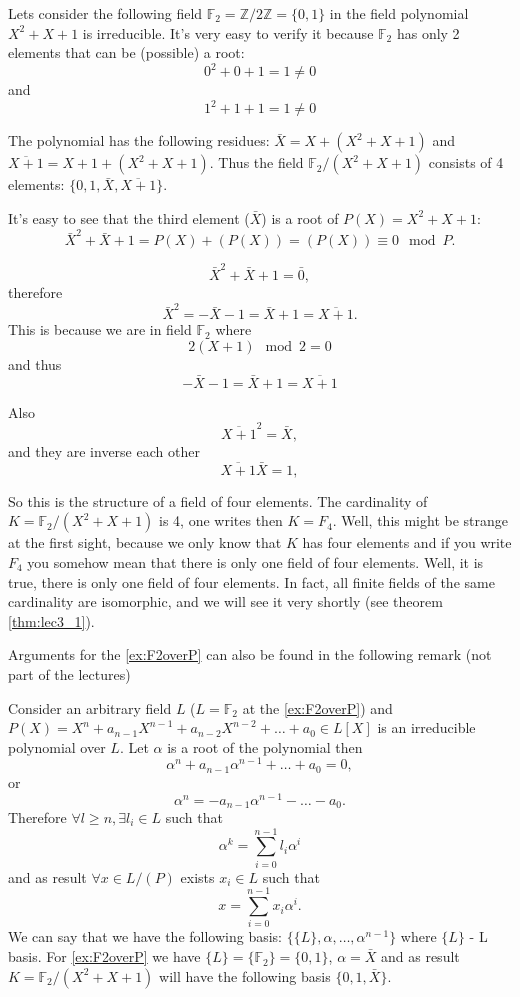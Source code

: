 \begin{example}[$K = \mathbb{F}_2/\left(X^2+X+1\right)$]
  Lets consider the following field
  $\mathbb{F}_2 = \mathbb{Z}/2\mathbb{Z} = \{0,1\}$ in the
  field polynomial $X^2+X+1$ is irreducible. It's very easy to verify
  it because $\mathbb{F}_2$ has only 2 elements that can be (possible)
  a root:
  \[
  0^2+0+1 = 1\ne 0
  \]
  and
  \[
  1^2+1+1 = 1\ne 0
  \]
  
  The polynomial has the following
  residues: $\bar{X} = X + \left(X^2+X+1\right)$ and
  $\overline{X + 1} = X + 1 + \left(X^2+X+1\right)$. Thus the field
  $\mathbb{F}_2/\left(X^2+X+1\right)$ consists of 4 elements:
  $\{0, 1, \bar{X}, \overline{X+1}\}$.

  It's easy to see that the third element ($\bar{X}$) is a root of
  $P(X) = X^2+X+1$:
  \[
  \bar{X}^2 + \bar{X} + 1 =
  P(X) + \left(P(X)\right) = \left(P(X)\right) \equiv 0 \mod P.
  \]
  
  \[
  \bar{X}^2 + \bar{X} + 1 = \bar{0},
  \]
  therefore 
  \[
  \bar{X}^2 = - \bar{X} - 1 = \bar{X} + 1 = \overline{X+1}.
  \]
  This is because we are in field $\mathbb{F}_2$ where
  \[
  2 \left(X + 1\right) \mod 2 = 0 
  \]
  and thus
  \[
  - \bar{X} - 1 = \bar{X} + 1 = \overline{X + 1}
  \]
  
  Also
  \[
  \overline{X+1}^2 = \bar{X},
  \]
  and they are inverse each other
  \[
  \overline{X+1} \bar{X} = 1,
  \]

  So this is the structure of a field of four elements.  The
  cardinality of $K=\mathbb{F}_2/\left(X^2+X+1\right)$ is 4,  one
  writes then $K=F_4$. Well, this might be 
  strange at the first sight, because we only know that $K$ has four
  elements and if you write $F_4$  you somehow mean that there is only
  one field of four elements. Well, it is true, there is only one
  field of four elements. In fact, all finite fields of the same
  cardinality are isomorphic, and we will see it very shortly
  (see theorem \ref{thm:lec3_1}).  
  \label{ex:F2overP}
\end{example}

Arguments for the \autoref{ex:F2overP} can also be found in the
following remark (not part of the lectures)
\begin{remark}
Consider an arbitrary field $L$ ($L=\mathbb{F}_2$ at the
\autoref{ex:F2overP}) and $P\left(X\right) = X^n + a_{n-1}X^{n-1} +
a_{n-2} X^{n-2} + \dots + a_0 \in L\left[X\right]$ is an
irreducible polynomial over $L$. Let $\alpha$ is a root of the
polynomial then 
\[
\alpha^n + a_{n-1} \alpha^{n-1} + \dots + a_0 = 0,
\]
or
\[
\alpha^n = - a_{n-1} \alpha^{n-1} - \dots - a_0.
\]
Therefore $\forall l \ge n, \exists l_i \in L$ such that 
\[
\alpha^k = \sum_{i=0}^{n-1}l_i \alpha^{i}
\]
and as result $\forall x \in L/\left(P\right)$ exists $x_i \in L$
such that 
\[
x = \sum_{i=0}^{n-1}x_i \alpha^{i}.
\]
We can say that we have the following basis: $\{\{L\}, \alpha, \dots,
\alpha^{n-1}\}$ where $\{L\}$ - L basis. For \autoref{ex:F2overP} we
have
$\{L\}= \{\mathbb{F}_2\}= \{0,1\}$, $\alpha = \bar{X}$ and as result
$K = \mathbb{F}_2/\left(X^2+X+1\right)$ will have the following basis
$\{0,1,\bar{X}\}$.
\end{remark}

